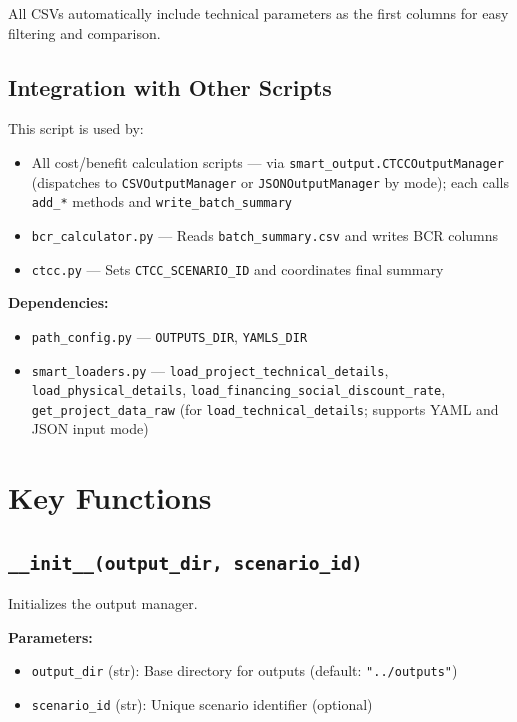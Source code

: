 \documentclass[ctcc_full_documentation.tex]{subfiles}
\begin{document}
All CSVs automatically include technical parameters as the first columns for easy filtering and comparison.

\subsection{Integration with Other Scripts}

This script is used by:
\begin{itemize}
    \item All cost/benefit calculation scripts --- via \texttt{smart\_output.CTCCOutputManager} (dispatches to \texttt{CSVOutputManager} or \texttt{JSONOutputManager} by mode); each calls \texttt{add\_*} methods and \texttt{write\_batch\_summary}
    \item \texttt{bcr\_calculator.py} --- Reads \texttt{batch\_summary.csv} and writes BCR columns
    \item \texttt{ctcc.py} --- Sets \texttt{CTCC\_SCENARIO\_ID} and coordinates final summary
\end{itemize}

\textbf{Dependencies:}
\begin{itemize}
    \item \texttt{path\_config.py} --- \texttt{OUTPUTS\_DIR}, \texttt{YAMLS\_DIR}
    \item \texttt{smart\_loaders.py} --- \texttt{load\_project\_technical\_details}, \texttt{load\_physical\_details}, \texttt{load\_financing\_social\_discount\_rate}, \texttt{get\_project\_data\_raw} (for \texttt{load\_technical\_details}; supports YAML and JSON input mode)
\end{itemize}

\section{Key Functions}

\subsection{\texttt{\_\_init\_\_(output\_dir, scenario\_id)}}

Initializes the output manager.

\textbf{Parameters:}
\begin{itemize}
    \item \texttt{output\_dir} (str): Base directory for outputs (default: \texttt{"../outputs"})
    \item \texttt{scenario\_id} (str): Unique scenario identifier (optional)
\end{itemize}
\end{document}
